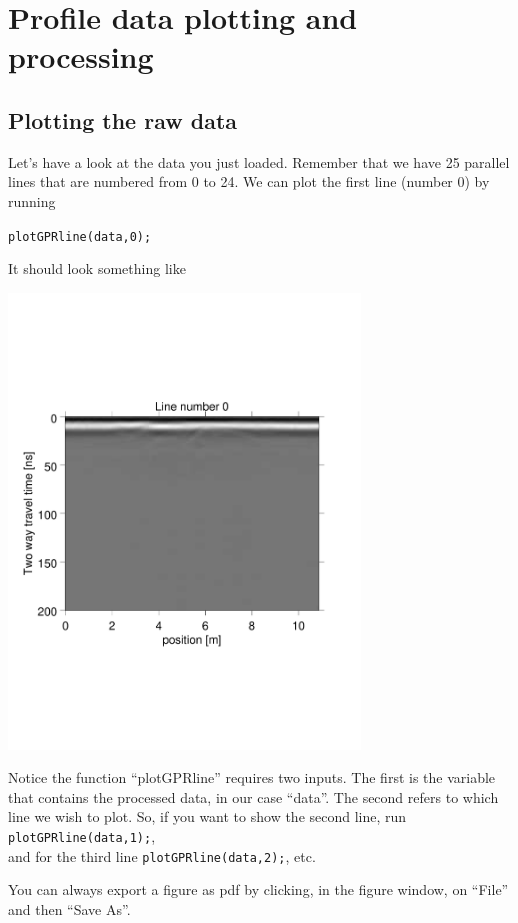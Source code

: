 \documentclass[11pt]{article}
\begin{document}
\section{Profile data plotting and processing}\label{secProfiles}

\subsection{Plotting the raw data}

Let's have a look at the data you just loaded. Remember that we have
25 parallel lines that are numbered from 0 to 24. We can plot the
first line (number 0) by running

\qquad \verb#plotGPRline(data,0);#


It should look something like
\begin{center}
\includegraphics[width=0.7\textwidth, trim = 0.9cm 6cm 2cm
  6.5cm,clip]{figures/GPRline0}
\end{center}

Notice the function ``plotGPRline'' requires two inputs. The first
is the variable that contains the processed data, in our case ``data''.
The second refers to which line we wish to plot. So, if you want to show the second line, run 
\qquad \verb#plotGPRline(data,1);#,
\\and for the third line
\qquad \verb#plotGPRline(data,2);#, etc.
 
You can always export a figure as pdf by clicking, in the figure
window, on ``File'' and then ``Save As''.
\end{document}
